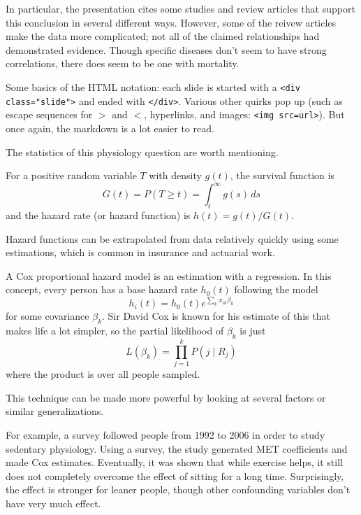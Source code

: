 In particular, the presentation cites some studies and review articles that support this conclusion in several different ways. However, some of the reivew articles make the data more complicated; not all of the claimed relationships had demonstrated evidence. Though specific diseases don't seem to have strong correlations, there does seem to be one with mortality.

Some basics of the HTML notation: each slide is started with a \texttt{<div class="slide">} and ended with \texttt{</div>}. Various other quirks pop up (such as escape sequences for $>$ and $<$, hyperlinks, and images: \texttt{<img src=url>}). But once again, the markdown is a lot easier to read.

The statistics of this physiology question are worth mentioning.
\begin{defn}
For a positive random variable $T$ with density $g(t)$, the survival function is \[G(t) = P(T \ge t) = \int_t^{\infty} g(s)\,ds\] and the hazard rate (or hazard function) is $h(t) =g(t)/G(t)$.
\end{defn}
Hazard functions can be extrapolated from data relatively quickly using some estimations, which is common in insurance and actuarial work.

A Cox proportional hazard model is an estimation with a regression. In this concept, every person has a base hazard rate $h_0(t)$ following the model
\[h_i(t) = h_0(t)e^{\sum_k x_{ik}\beta_k}\]
for some covariance $\beta_k$. Sir David Cox is known for his estimate of this that makes life a lot simpler, so the partial likelihood of $\beta_k$ is just
\[L(\beta_k) = \prod_{j=1}^k P(j\mid R_j)\] where the product is over all people sampled.

This technique can be made more powerful by looking at several factors or similar generalizations.

For example, a survey followed people from 1992 to 2006 in order to study sedentary physiology. Using a survey, the study generated MET coefficients and made Cox estimates. Eventually, it was shown that while exercise helps, it still does not completely overcome the effect of sitting for a long time. Surprisingly, the effect is stronger for leaner people, though other confounding variables don't have very much effect.

